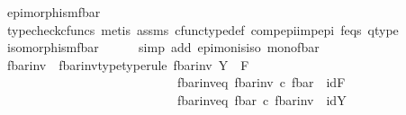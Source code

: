 \begin{isabellebody}
\ {\isachardoublequoteopen}epimorphism{\isacharparenleft}{\kern0pt}f{\isacharunderscore}{\kern0pt}bar{\isacharparenright}{\kern0pt}{\isachardoublequoteclose}\isanewline
\ \ \ \ \isamarkupfalse%
\ {\isacharparenleft}{\kern0pt}typecheck{\isacharunderscore}{\kern0pt}cfuncs{\isacharcomma}{\kern0pt}\ metis\ assms{\isacharparenleft}{\kern0pt}{}{\isacharparenright}{\kern0pt}\ cfunc{\isacharunderscore}{\kern0pt}type{\isacharunderscore}{\kern0pt}def\ comp{\isacharunderscore}{\kern0pt}epi{\isacharunderscore}{\kern0pt}imp{\isacharunderscore}{\kern0pt}epi\ f{\isacharunderscore}{\kern0pt}eqs\ q{\isacharunderscore}{\kern0pt}type{\isacharparenright}{\kern0pt}\isanewline
\ \ \isanewline
\ \ \isamarkupfalse%
\ \isamarkupfalse%
\ {\isachardoublequoteopen}isomorphism{\isacharparenleft}{\kern0pt}f{\isacharunderscore}{\kern0pt}bar{\isacharparenright}{\kern0pt}{\isachardoublequoteclose}\isanewline
\ \ \ \ \isamarkupfalse%
\ {\isacharparenleft}{\kern0pt}simp\ add{\isacharcolon}{\kern0pt}\ epi{\isacharunderscore}{\kern0pt}mon{\isacharunderscore}{\kern0pt}is{\isacharunderscore}{\kern0pt}iso\ mono{\isacharunderscore}{\kern0pt}fbar{\isacharparenright}{\kern0pt}\isanewline
\isanewline
\ \ \isanewline
\ \ \isanewline
\isanewline
\ \ \isamarkupfalse%
\ f{\isacharunderscore}{\kern0pt}bar{\isacharunderscore}{\kern0pt}inv\ \ f{\isacharunderscore}{\kern0pt}bar{\isacharunderscore}{\kern0pt}inv{\isacharunderscore}{\kern0pt}type{\isacharbrackleft}{\kern0pt}type{\isacharunderscore}{\kern0pt}rule{\isacharbrackright}{\kern0pt}{\isacharcolon}{\kern0pt}\ {\isachardoublequoteopen}f{\isacharunderscore}{\kern0pt}bar{\isacharunderscore}{\kern0pt}inv{\isacharcolon}{\kern0pt}\ Y\ {\isasymrightarrow}\ F{\isachardoublequoteclose}\ \isanewline
\ \ \ \ \ \ \ \ \ \ \ \ \ \ \ \ \ \ \ \ \ \ \ \ \ \ \ \ f{\isacharunderscore}{\kern0pt}bar{\isacharunderscore}{\kern0pt}inv{\isacharunderscore}{\kern0pt}eq{}{\isacharcolon}{\kern0pt}\ {\isachardoublequoteopen}f{\isacharunderscore}{\kern0pt}bar{\isacharunderscore}{\kern0pt}inv\ {\isasymcirc}\isactrlsub c\ f{\isacharunderscore}{\kern0pt}bar\ {\isacharequal}{\kern0pt}\ id{\isacharparenleft}{\kern0pt}F{\isacharparenright}{\kern0pt}{\isachardoublequoteclose}\ \ \ \isanewline
\ \ \ \ \ \ \ \ \ \ \ \ \ \ \ \ \ \ \ \ \ \ \ \ \ \ \ \ f{\isacharunderscore}{\kern0pt}bar{\isacharunderscore}{\kern0pt}inv{\isacharunderscore}{\kern0pt}eq{}{\isacharcolon}{\kern0pt}\ {\isachardoublequoteopen}f{\isacharunderscore}{\kern0pt}bar\ {\isasymcirc}\isactrlsub c\ f{\isacharunderscore}{\kern0pt}bar{\isacharunderscore}{\kern0pt}inv\ {\isacharequal}{\kern0pt}\ id{\isacharparenleft}{\kern0pt}Y{\isacharparenright}{\kern0pt}{\isachardoublequoteclose}\isanewline

\end{isabellebody}
